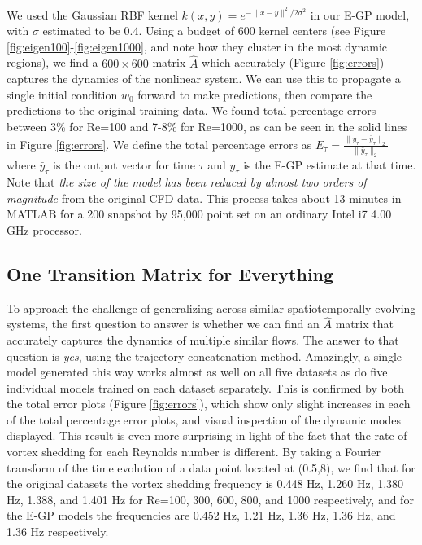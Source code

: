 \documentclass[letterpaper,12pt,peerreviewca,draftcls]{IEEEtran}
\newcommand{\s}{\sigma}
\newcommand{\weight}{w}
\newcommand{\kernel}{k}
\newcommand{\dualop}{A}
\newcommand{\dualopApprox}{\widehat{\dualop}}
\newcommand{\tindex}{\tau}
\begin{document}
We used the Gaussian RBF kernel $\kernel(x,y) = e^{-\|x-y\|^2/2\s^2}$ in our E-GP model, with $\s$ estimated to be 0.4. Using a budget of 600 kernel centers (see Figure \ref{fig:eigen100}-\ref{fig:eigen1000}, and note how they cluster in the most dynamic regions), we find a $600\times600$ matrix $\dualopApprox$ which accurately (Figure \ref{fig:errors}) captures the dynamics of the nonlinear system. We can use this to propagate a single initial condition $\weight_{0}$ forward to make predictions, then compare the predictions to the original training data. We found total percentage errors between 3\% for Re=100 and 7-8\% for Re=1000, as can be seen in the solid lines in Figure \ref{fig:errors}. We define the total percentage errors as
$E_\tindex = \frac{\|y_\tindex-\bar y_\tindex\|_2}{\|\bar y_\tindex\|_2}$
where $\bar y_\tindex$ is the output vector for time $\tindex$ and $y_\tindex$ is the E-GP estimate at that time. Note that \emph{the size of the model has been reduced by almost two orders of magnitude} from the original CFD data. This process takes about 13 minutes in MATLAB for a 200 snapshot by 95,000 point set on an ordinary Intel i7 4.00 GHz processor.

\subsection{One Transition Matrix for Everything}\label{sec:lotr}

To approach the challenge of generalizing across similar spatiotemporally evolving systems, the first question to answer is whether we can find an $\dualopApprox$ matrix that accurately captures the dynamics of multiple similar flows. The answer to that question is \textit{yes}, using the trajectory concatenation method. Amazingly, a single model generated this way works almost as well on all five datasets as do five individual models trained on each dataset separately. This is confirmed by both the total error plots (Figure \ref{fig:errors}), which show only slight increases in each of the total percentage error plots, and visual inspection of the dynamic modes displayed. This result is even more surprising in light of the fact that the rate of vortex shedding for each Reynolds number is different. By taking a Fourier transform of the time evolution of a data point located at (0.5,8), we find that for the original datasets the vortex shedding frequency is 0.448 Hz, 1.260 Hz, 1.380 Hz, 1.388, and 1.401 Hz for Re=100, 300, 600, 800, and 1000 respectively, and for the E-GP models the frequencies are 0.452 Hz, 1.21 Hz, 1.36 Hz, 1.36 Hz, and 1.36 Hz respectively.
\end{document}
